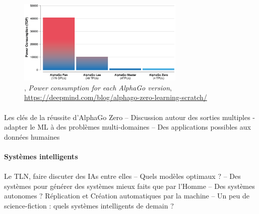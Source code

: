 \begin{figure}[h]
    \centering
    \includegraphics[width=300px]{chapters/03/images/alphago-consumption.png}
    \caption{\label{comparatif}, \emph{Power consumption for each AlphaGo version}, \url{https://deepmind.com/blog/alphago-zero-learning-scratch/}}
\end{figure}

\paragraph{} Les clés de la réussite d'AlphaGo Zero -- Discussion autour des sorties multiples - adapter le
ML à des problèmes multi-domaines -- Des applications possibles aux données humaines

\paragraph{Systèmes intelligents}

\paragraph{} Le TLN, faire discuter des IAs entre elles -- Quels modèles optimaux ? -- Des systèmes pour
générer des systèmes mieux faits que par l'Homme -- Des systèmes autonomes ? Réplication et Création
automatiques par la machine -- Un peu de science-fiction : quels systèmes intelligents de demain ?
